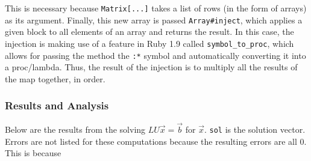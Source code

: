 \documentclass[letterpaper,12pt]{article}
\begin{document}
This is necessary because \texttt{Matrix[...]} takes a list of rows (in the
form of arrays) as its argument.
Finally, this new array is passed \texttt{Array\#inject}, which applies a given
block to all elements of an array and returns the result.
In this case, the injection is making use of a feature in Ruby 1.9 called
\texttt{symbol\_to\_proc}, which allows for passing the method the \texttt{:*}
symbol and automatically converting it into a proc/lambda.
Thus, the result of the injection is to multiply all the results of the map
together, in order.

\subsubsection{Results and Analysis}

Below are the results from the solving $LU\vec{x} = \vec{b}$ for $\vec{x}$.
\texttt{sol} is the solution vector.
Errors are not listed for these computations because the resulting errors are
all 0.
This is because
\end{document}
